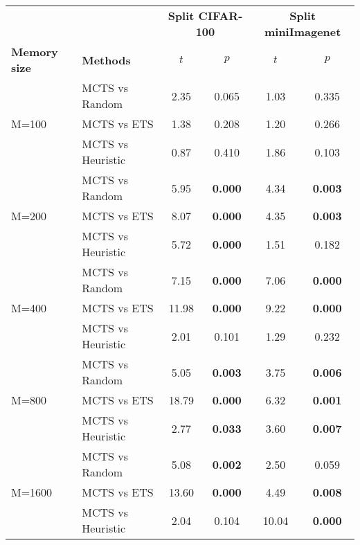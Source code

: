 \begin{tabular}{llcccc}
\toprule
                        &                  & \multicolumn{2}{c}{\textbf{Split CIFAR-100}} & \multicolumn{2}{c}{\textbf{Split miniImagenet}} \\
\cmidrule(lr){3-4} \cmidrule(lr){5-6}
\textbf{Memory size}    & \textbf{Methods} & $t$                  & $p$                     & $t$                    & $p$                      \\
\midrule
\multirow{3}{*}{M=100}  & MCTS vs Random  & 2.35     & 0.065             & 1.03       & 0.335              \\
                        & MCTS vs ETS     & 1.38     & 0.208             & 1.20       & 0.266              \\
                        & MCTS vs Heuristic & 0.87     & 0.410             & 1.86       & 0.103              \\
\midrule
\multirow{3}{*}{M=200}  & MCTS vs Random  & 5.95     & \textbf{0.000}    & 4.34       & \textbf{0.003}     \\
                        & MCTS vs ETS     & 8.07     & \textbf{0.000}    & 4.35       & \textbf{0.003}     \\
                        & MCTS vs Heuristic & 5.72     & \textbf{0.000}    & 1.51       & 0.182              \\
\midrule
\multirow{3}{*}{M=400}  & MCTS vs Random  & 7.15     & \textbf{0.000}    & 7.06       & \textbf{0.000}     \\
                        & MCTS vs ETS     & 11.98    & \textbf{0.000}    & 9.22       & \textbf{0.000}     \\
                        & MCTS vs Heuristic & 2.01     & 0.101             & 1.29       & 0.232              \\
\midrule
\multirow{3}{*}{M=800}  & MCTS vs Random  & 5.05     & \textbf{0.003}    & 3.75       & \textbf{0.006}     \\
                        & MCTS vs ETS     & 18.79    & \textbf{0.000}    & 6.32       & \textbf{0.001}     \\
                        & MCTS vs Heuristic & 2.77     & \textbf{0.033}    & 3.60       & \textbf{0.007}     \\
\midrule
\multirow{3}{*}{M=1600} & MCTS vs Random  & 5.08     & \textbf{0.002}    & 2.50       & 0.059              \\
                        & MCTS vs ETS     & 13.60    & \textbf{0.000}    & 4.49       & \textbf{0.008}     \\
                        & MCTS vs Heuristic & 2.04     & 0.104             & 10.04      & \textbf{0.000}     \\
\bottomrule
\end{tabular}